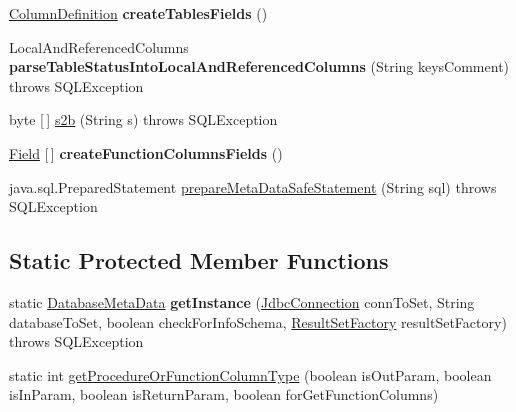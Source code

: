 \begin{DoxyCompactItemize}
\item 
\mbox{\label{classcom_1_1mysql_1_1cj_1_1jdbc_1_1_database_meta_data_a17ea33b4514108559a3860e8abacb7ad}} 
\mbox{\hyperlink{interfacecom_1_1mysql_1_1cj_1_1protocol_1_1_column_definition}{Column\+Definition}} {\bfseries create\+Tables\+Fields} ()
\item 
\mbox{\label{classcom_1_1mysql_1_1cj_1_1jdbc_1_1_database_meta_data_a9a3bd2cd8affbc09ea36b63fb2ef22fe}} 
Local\+And\+Referenced\+Columns {\bfseries parse\+Table\+Status\+Into\+Local\+And\+Referenced\+Columns} (String keys\+Comment)  throws S\+Q\+L\+Exception 
\item 
byte \mbox{[}$\,$\mbox{]} \mbox{\hyperlink{classcom_1_1mysql_1_1cj_1_1jdbc_1_1_database_meta_data_a23ae1936e5c32dc95c519cd9b5080b75}{s2b}} (String s)  throws S\+Q\+L\+Exception 
\item 
\mbox{\label{classcom_1_1mysql_1_1cj_1_1jdbc_1_1_database_meta_data_a1b2ad2509b2f089d873bdcf04214472d}} 
\mbox{\hyperlink{classcom_1_1mysql_1_1cj_1_1result_1_1_field}{Field}} \mbox{[}$\,$\mbox{]} {\bfseries create\+Function\+Columns\+Fields} ()
\item 
java.\+sql.\+Prepared\+Statement \mbox{\hyperlink{classcom_1_1mysql_1_1cj_1_1jdbc_1_1_database_meta_data_a41de275819e636320ff5ec1c8b30d03d}{prepare\+Meta\+Data\+Safe\+Statement}} (String sql)  throws S\+Q\+L\+Exception 
\end{DoxyCompactItemize}
\subsection*{Static Protected Member Functions}
\begin{DoxyCompactItemize}
\item 
\mbox{\label{classcom_1_1mysql_1_1cj_1_1jdbc_1_1_database_meta_data_a599d79d54f0f2dcee19845af18403094}} 
static \mbox{\hyperlink{classcom_1_1mysql_1_1cj_1_1jdbc_1_1_database_meta_data}{Database\+Meta\+Data}} {\bfseries get\+Instance} (\mbox{\hyperlink{interfacecom_1_1mysql_1_1cj_1_1jdbc_1_1_jdbc_connection}{Jdbc\+Connection}} conn\+To\+Set, String database\+To\+Set, boolean check\+For\+Info\+Schema, \mbox{\hyperlink{classcom_1_1mysql_1_1cj_1_1jdbc_1_1result_1_1_result_set_factory}{Result\+Set\+Factory}} result\+Set\+Factory)  throws S\+Q\+L\+Exception 
\item 
static int \mbox{\hyperlink{classcom_1_1mysql_1_1cj_1_1jdbc_1_1_database_meta_data_a3e763c50539692ca2f6c0c987cec3fca}{get\+Procedure\+Or\+Function\+Column\+Type}} (boolean is\+Out\+Param, boolean is\+In\+Param, boolean is\+Return\+Param, boolean for\+Get\+Function\+Columns)
\end{DoxyCompactItemize}

